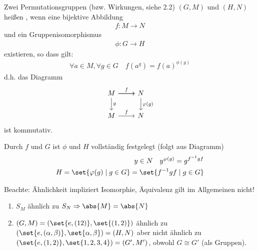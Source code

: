 \begin{definition}\label{sec1:def:similar}
	Zwei Permutationsgruppen (bzw. Wirkungen, siehe 2.2) %
	$(G,M)$ und $(H,N)$ heißen , wenn eine bijektive Abbildung  
	\begin{align*}
		f\colon M \to N
	\end{align*}
	und ein Gruppenisomorphismus
	\begin{align*}
		\phi\colon G \to H
	\end{align*} 
	existieren, so dass gilt:
	\begin{align*}
		\forall a \in M, \forall g\in G\quad f(a^g) = f(a)^{\phi(g)}
	\end{align*}
	d.h. das Diagramm
	\[
	\begin{tikzcd}
		M \arrow[r] \arrow[d, "g"] \arrow[r, "f"] & N \arrow[d, "\phi(g)"] \\
		M \arrow[r, "f"]                          & N                     
	\end{tikzcd}
	\]
	ist kommutativ.
\end{definition}
\begin{*remark}
	Durch $f$ und $G$ ist $\phi$ und $H$ vollständig festgelegt (folgt aus Diagramm)
	\begin{align*}
		y \in N \quad y^{\phi(g)} = g^{f^{-1}gf}\\
		H = \set{\phi(g) \mid g \in G} = \set{f^{-1}gf \mid g \in G}
	\end{align*}
\end{*remark}
Beachte: Ähnlichkeit impliziert Isomorphie, Äquivalenz gilt im Allgemeinen nicht!
\begin{example}
	\begin{enumerate}
		\item $S_M$ ähnlich zu $S_N \implies \abs{M} = \abs{N}$
		\item $(G,M) = (\set{e, (12)}, \set{(1,2)})$ ähnlich zu $(\set{e, (\alpha, \beta)}, \set{\alpha, \beta}) = (H,N)$ aber nicht ähnlich zu $(\set{e, (1,2)}, \set{1,2,3,4}) = (G',M')$, obwohl $G \cong G'$ (als Gruppen).
	\end{enumerate}
\end{example}
